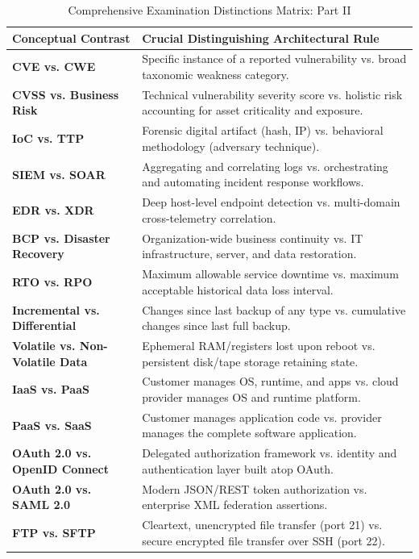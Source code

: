 \begin{table}[htbp]
\centering
\caption{Comprehensive Examination Distinctions Matrix: Part II}
\label{tab:master_distinctions_part2}
\begin{tabularx}{\textwidth}{p{4.5cm} X}
\toprule
\textbf{Conceptual Contrast} & \textbf{Crucial Distinguishing Architectural Rule} \\
\midrule
\textbf{CVE vs. CWE} & Specific instance of a reported vulnerability vs. broad taxonomic weakness category. \\
\textbf{CVSS vs. Business Risk} & Technical vulnerability severity score vs. holistic risk accounting for asset criticality and exposure. \\
\textbf{IoC vs. TTP} & Forensic digital artifact (hash, IP) vs. behavioral methodology (adversary technique). \\
\textbf{SIEM vs. SOAR} & Aggregating and correlating logs vs. orchestrating and automating incident response workflows. \\
\textbf{EDR vs. XDR} & Deep host-level endpoint detection vs. multi-domain cross-telemetry correlation. \\
\textbf{BCP vs. Disaster Recovery} & Organization-wide business continuity vs. IT infrastructure, server, and data restoration. \\
\textbf{RTO vs. RPO} & Maximum allowable service downtime vs. maximum acceptable historical data loss interval. \\
\textbf{Incremental vs. Differential} & Changes since last backup of any type vs. cumulative changes since last full backup. \\
\textbf{Volatile vs. Non-Volatile Data} & Ephemeral RAM/registers lost upon reboot vs. persistent disk/tape storage retaining state. \\
\textbf{IaaS vs. PaaS} & Customer manages OS, runtime, and apps vs. cloud provider manages OS and runtime platform. \\
\textbf{PaaS vs. SaaS} & Customer manages application code vs. provider manages the complete software application. \\
\textbf{OAuth 2.0 vs. OpenID Connect} & Delegated authorization framework vs. identity and authentication layer built atop OAuth. \\
\textbf{OAuth 2.0 vs. SAML 2.0} & Modern JSON/REST token authorization vs. enterprise XML federation assertions. \\
\textbf{FTP vs. SFTP} & Cleartext, unencrypted file transfer (port 21) vs. secure encrypted file transfer over SSH (port 22). \\
\bottomrule
\end{tabularx}
\end{table}

